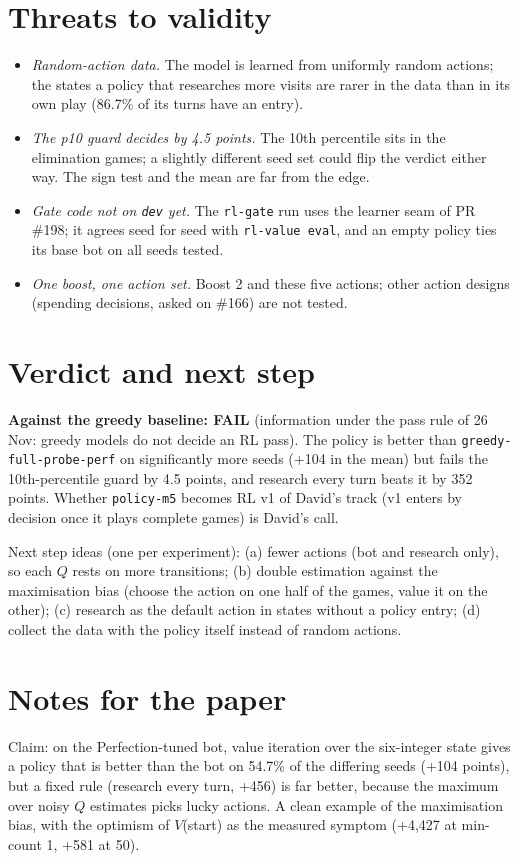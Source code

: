 \documentclass{../polyexp}
\begin{document}

\section{Threats to validity}
\begin{itemize}
  \item \emph{Random-action data.} The model is learned from uniformly random actions; the states a policy that
        researches more visits are rarer in the data than in its own play (86.7\% of its turns have an entry).
  \item \emph{The p10 guard decides by 4.5 points.} The 10th percentile sits in the elimination games; a slightly
        different seed set could flip the verdict either way. The sign test and the mean are far from the edge.
  \item \emph{Gate code not on \texttt{dev} yet.} The \texttt{rl-gate} run uses the learner seam of PR \#198; it agrees
        seed for seed with \texttt{rl-value eval}, and an empty policy ties its base bot on all seeds tested.
  \item \emph{One boost, one action set.} Boost 2 and these five actions; other action designs (spending decisions,
        asked on \#166) are not tested.
\end{itemize}

\section{Verdict and next step}
\textbf{Against the greedy baseline: FAIL} (information under the pass rule of 26 Nov: greedy models do not decide
an RL pass). The policy is better than \texttt{greedy-full-probe-perf} on significantly more seeds (+104 in the
mean) but fails the 10th-percentile guard by 4.5 points, and research every turn beats it by 352 points.
Whether \texttt{policy-m5} becomes RL v1 of David's track (v1 enters by decision once it plays complete games) is
David's call.

Next step ideas (one per experiment): (a) fewer actions (bot and research only), so each $Q$ rests on more
transitions; (b) double estimation against the maximisation bias (choose the action on one half of the games,
value it on the other); (c) research as the default action in states without a policy entry; (d) collect the data
with the policy itself instead of random actions.

\section{Notes for the paper}
Claim: on the Perfection-tuned bot, value iteration over the six-integer state gives a policy that is better than
the bot on 54.7\% of the differing seeds (+104 points), but a fixed rule (research every turn, +456) is far better,
because the maximum over noisy $Q$ estimates picks lucky actions. A clean example of the maximisation bias, with the
optimism of $V$(start) as the measured symptom (+4{,}427 at min-count 1, +581 at 50).

\end{document}
